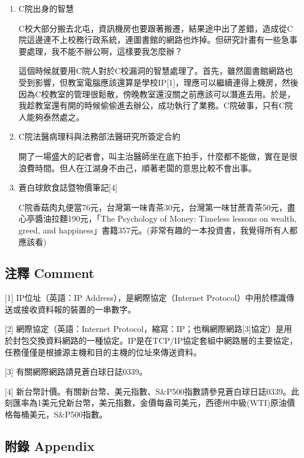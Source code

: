 \documentclass[a5paper, 11pt
]{book}
\begin{document}
\begin{enumerate}
\def\labelenumi{\arabic{enumi}.}
\item
  C院出身的智慧

  C校大部分搬去北屯，資訊機房也要跟著搬遷，結果途中出了差錯，造成從C院這邊連不上校務行政系統，連圖書館的網路也炸掉。但研究計畫有一些急事要處理，我不能不辦公啊，這樣要我怎麼辦？

  這個時候就要用C院人對於C校漏洞的智慧處理了。首先，雖然圖書館網路也受到影響，但教室電腦應該還算是學校IP{[}1{]}，理應可以繼續連得上機房，然後因為C校教室的管理很鬆散，傍晚教室還沒關之前應該可以潛進去用。於是，我趁教室還有開的時候偷偷進去辦公，成功執行了業務。C院破事，只有C院人能夠泰然處之。
\item
  C院法醫病理科與法務部法醫研究所簽定合約

  開了一場盛大的記者會，叫主治醫師坐在底下拍手，什麼都不能做，實在是很浪費時間。但人在江湖身不由己，順著老闆的意思比較不會出事。
\item
  蒼白球飲食誌暨物價筆記{[}4{]}

  C院香菇肉丸便當76元，台灣第一味青茶30元，台灣第一味甘蔗青茶50元，盡心亭醬油拉麵190元，「The
  Psychology of Money: Timeless lessons on wealth, greed, and
  happiness」書籍357元。(非常有趣的一本投資書，我覺得所有人都應該看)
\end{enumerate}

\hypertarget{ux6ce8ux91cb-comment-15}{%
\subsection{注釋 Comment}\label{ux6ce8ux91cb-comment-15}}

{[}1{]} IP位址（英語：IP Address），是網際協定（Internet
Protocol）中用於標識傳送或接收資料報的裝置的一串數字。

{[}2{]} 網際協定（英語：Internet
Protocol，縮寫：IP；也稱網際網路{[}3{]}協定）是用於封包交換資料網路的一種協定。IP是在TCP/IP協定套組中網路層的主要協定，任務僅僅是根據源主機和目的主機的位址來傳送資料。

{[}3{]} 有關網際網路請見蒼白球日誌0339。

{[}4{]}
新台幣計價。有關新台幣、美元指數、S\&P500指數請參見蒼白球日誌0339。此刻匯率為1美元兌新台幣，美元指數，金價每盎司美元，西德州中級(WTI)原油價格每桶美元，S\&P500指數。

\hypertarget{ux9644ux9304-appendix-15}{%
\subsection{附錄 Appendix}\label{ux9644ux9304-appendix-15}}
\end{document}
